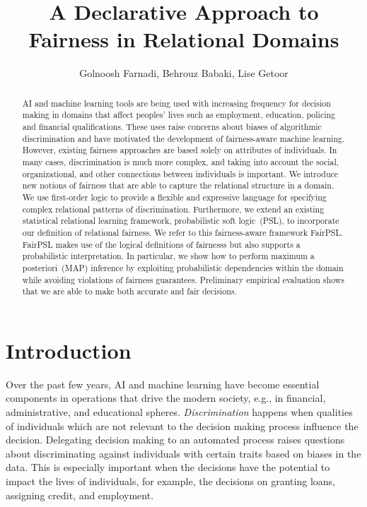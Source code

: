 \documentclass[11pt]{article}
\begin{document}
\title{A Declarative Approach to Fairness in Relational Domains}
\author{Golnoosh Farnadi, Behrouz Babaki, Lise Getoor}

\maketitle

\begin{abstract}
AI and machine learning tools are being used with increasing frequency for decision making in domains that affect peoples' lives such as employment, education, policing and %
financial qualifications. These uses raise concerns about biases of algorithmic discrimination and have motivated the development of fairness-aware machine learning. However, existing fairness approaches are based solely on attributes of individuals. In many cases, discrimination is much more complex, and taking into account the social, organizational, and other connections between individuals is important. We introduce new notions of fairness that are able to capture the relational structure in a domain. We use first-order logic to provide a flexible and expressive language for specifying complex relational patterns of discrimination. Furthermore, we extend an existing statistical relational learning framework, probabilistic soft logic~(PSL), to incorporate our definition of relational fairness. We refer to this fairness-aware framework FairPSL. FairPSL makes use of the logical definitions of fairnesss but also supports a probabilistic interpretation. In particular, we show how to perform maximum a posteriori~(MAP) inference by exploiting probabilistic dependencies within the domain while avoiding violations of fairness guarantees. Preliminary empirical evaluation shows that we are able to make both accurate and fair decisions.
\end{abstract}

\section{Introduction}
\label{sec:introduction}

Over the past few years, AI and machine learning have become essential components in operations that drive the modern society, e.g., in financial, administrative, and educational spheres. \emph{Discrimination} happens when qualities of individuals which are not relevant to the decision making process influence the decision. Delegating decision making to an automated process raises questions about discriminating against individuals with certain traits based on biases in the data. This is especially important when the decisions have the potential to impact the lives of individuals, for example, the decisions on granting loans, assigning credit, and employment. 
\end{document}
